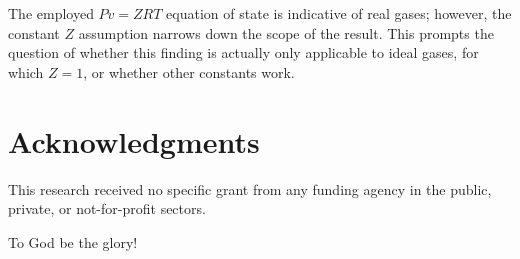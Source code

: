 \documentclass[fleqn,11pt]{SelfArx}
\begin{document}
    The employed $Pv = ZRT$ equation of state is indicative of real gases; however, the constant
    $Z$ assumption narrows down the scope of the result. This prompts the  question  of  whether
    this finding is actually only applicable to ideal gases, for which $Z=1$, or  whether  other
    constants work.


\section*{Acknowledgments}

    This research received no specific grant from any funding agency in the public, private,  or
    not-for-profit sectors.

    To God be the glory!





\end{document}
